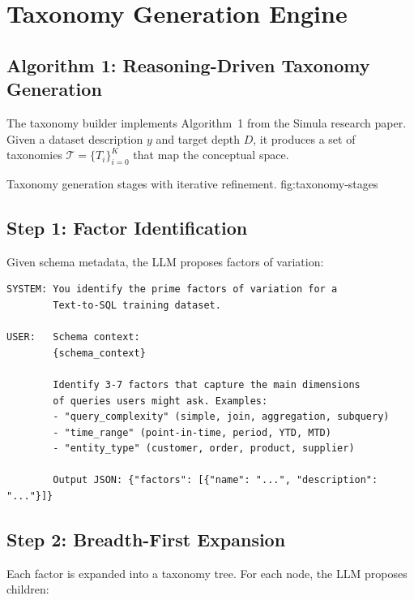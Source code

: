 \chapter{Taxonomy Generation Engine}
\label{chap:taxonomy}\label{sim:chap:taxonomy}

\section{Algorithm 1: Reasoning-Driven Taxonomy Generation}

The taxonomy builder implements Algorithm~1 from the Simula research paper. Given a
dataset description $y$ and target depth $D$, it produces a set of taxonomies
$\mathcal{T} = \{T_i\}_{i=0}^{K}$ that map the conceptual space.

%
  {Taxonomy generation stages with iterative refinement.}%
  {fig:taxonomy-stages}

\section{Step 1: Factor Identification}

Given schema metadata, the LLM proposes factors of variation:

\begin{lstlisting}[language=jsonx,caption={Factor identification prompt}]
SYSTEM: You identify the prime factors of variation for a 
        Text-to-SQL training dataset.
        
USER:   Schema context:
        {schema_context}
        
        Identify 3-7 factors that capture the main dimensions
        of queries users might ask. Examples:
        - "query_complexity" (simple, join, aggregation, subquery)
        - "time_range" (point-in-time, period, YTD, MTD)
        - "entity_type" (customer, order, product, supplier)
        
        Output JSON: {"factors": [{"name": "...", "description": "..."}]}
\end{lstlisting}

\section{Step 2: Breadth-First Expansion}

Each factor is expanded into a taxonomy tree. For each node, the LLM proposes children:

